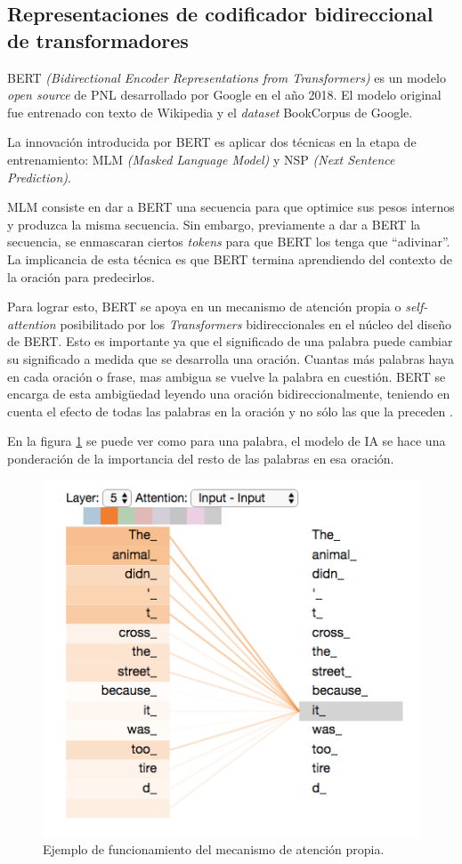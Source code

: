 \subsection{Representaciones de codificador bidireccional de transformadores}

BERT \textit{(Bidirectional Encoder Representations from Transformers)} es un modelo \textit{open source} de PNL desarrollado por Google en el año 2018. El modelo original fue entrenado con texto de Wikipedia y el \textit{dataset} BookCorpus de Google.

La innovación introducida por BERT es aplicar dos técnicas en la etapa de entrenamiento: MLM \textit{(Masked Language Model)} y NSP \textit{(Next Sentence Prediction)}. 

MLM consiste en dar a BERT una secuencia para que optimice sus pesos internos y produzca la misma secuencia. Sin embargo, previamente a dar a BERT la secuencia, se enmascaran ciertos \textit{tokens} para que BERT los tenga que ``adivinar''. La implicancia de esta técnica es que BERT termina aprendiendo del contexto de la oración para predecirlos.

Para lograr esto, BERT se apoya en un mecanismo de atención propia o \textit{self-attention} posibilitado por los \textit{Transformers} bidireccionales en el núcleo del diseño de BERT. Esto es importante ya que el significado de una palabra puede cambiar su significado a medida que se desarrolla una oración. Cuantas más palabras haya en cada oración o frase, mas ambigua se  vuelve la palabra en cuestión. BERT se encarga de esta ambigüedad leyendo una oración bidireccionalmente, teniendo en cuenta el efecto de todas las palabras en la oración y no sólo las que la preceden \citep{WEBSITE:20}.

En la figura \ref{fig:selfattention} se puede ver como para una palabra, el modelo de IA se hace una ponderación de la importancia del resto de las palabras en esa oración.

\begin{figure}[htbp]
	\centering
	\includegraphics[width=.6\textwidth]{./Figures/selfattention.png}
	\caption{Ejemplo de funcionamiento del mecanismo de atención propia\protect\footnotemark.}
	\label{fig:selfattention}
\end{figure}

